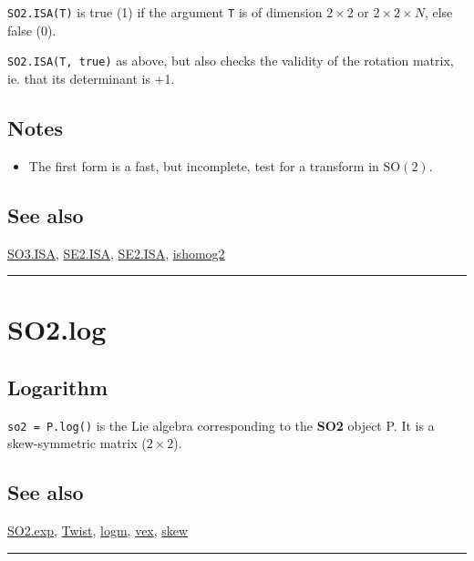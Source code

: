 \texttt{SO2.ISA(T)} is true (1) if the argument \texttt{T} is of dimension $2 \times 2$ or $2 \times 2 \times N$, else
false (0).



\texttt{SO2.ISA(T, true)} as above, but also checks the validity of the rotation
matrix, ie. that its determinant is +1.


\subsection*{Notes}
\begin{itemize}
  \item The first form is a fast, but incomplete, test for a transform in $\mbox{SO}(2)$.
\end{itemize}

\subsection*{See also}


\hyperlink{SO3.ISA}{\color{blue} SO3.ISA}, \hyperlink{SE2.ISA}{\color{blue} SE2.ISA}, \hyperlink{SE2.ISA}{\color{blue} SE2.ISA}, \hyperlink{ishomog2}{\color{blue} ishomog2}

\vspace{1.5ex}\hrule

\hypertarget{SO2.log}{\section*{SO2.log}}
\subsection*{Logarithm}


\texttt{so2 = P.log()} is the Lie algebra corresponding to the \textbf{\color{red} SO2} object P. It is
a skew-symmetric matrix ($2 \times 2$).


\subsection*{See also}


\hyperlink{SO2.exp}{\color{blue} SO2.exp}, \hyperlink{Twist}{\color{blue} Twist}, \hyperlink{logm}{\color{blue} logm}, \hyperlink{vex}{\color{blue} vex}, \hyperlink{skew}{\color{blue} skew}

\vspace{1.5ex}\hrule

